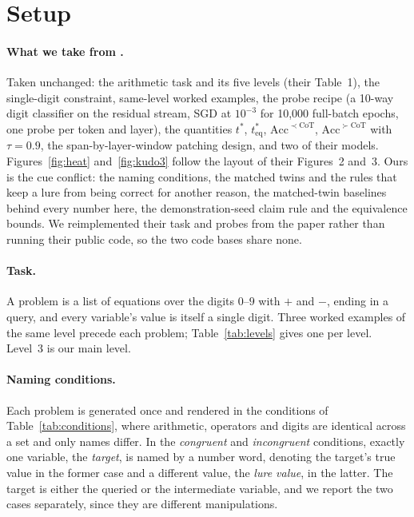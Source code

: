\documentclass[11pt]{article}
\begin{document}
\section{Setup}

\paragraph{What we take from \citet{kudo2026faithful}.} Taken unchanged: the arithmetic task and its five levels
(their Table~1), the single-digit constraint, same-level worked examples, the
probe recipe (a 10-way digit classifier on the residual stream, SGD at $10^{-3}$ for 10{,}000
full-batch epochs, one probe per token and layer), the quantities $t^{*}$,
$t^{*}_{\text{eq}}$, $\mathrm{Acc}^{\prec\mathrm{CoT}}$, $\mathrm{Acc}^{\succ\mathrm{CoT}}$ with
$\tau=0.9$, the span-by-layer-window patching design, and two of their models.
Figures~\ref{fig:heat} and~\ref{fig:kudo3} follow the layout of their Figures~2 and~3. Ours is
the cue conflict: the naming conditions, the matched twins and the rules that keep a lure from
being correct for another reason, the matched-twin baselines behind every number here, the
demonstration-seed claim rule and the equivalence bounds. We reimplemented their task and probes
from the paper rather than running their public code, so the two code bases share none.

\paragraph{Task.} A problem is a list of equations over the digits $0$--$9$ with $+$ and $-$,
ending in a query, and every variable's value is itself a single digit. Three worked examples of
the same level precede each problem; Table~\ref{tab:levels} gives one per level. Level~3 is our
main level.

\paragraph{Naming conditions.} Each problem is generated once and rendered in the conditions of
Table~\ref{tab:conditions}, where arithmetic, operators and digits are identical across a set
and only names differ. In the \emph{congruent} and \emph{incongruent} conditions, exactly one
variable, the \emph{target}, is named by a number word, denoting the target's true value in the
former case and a different value, the \emph{lure value}, in the latter. The target is either
the queried or the intermediate variable, and we report the two cases separately, since they are
different manipulations.
\end{document}
